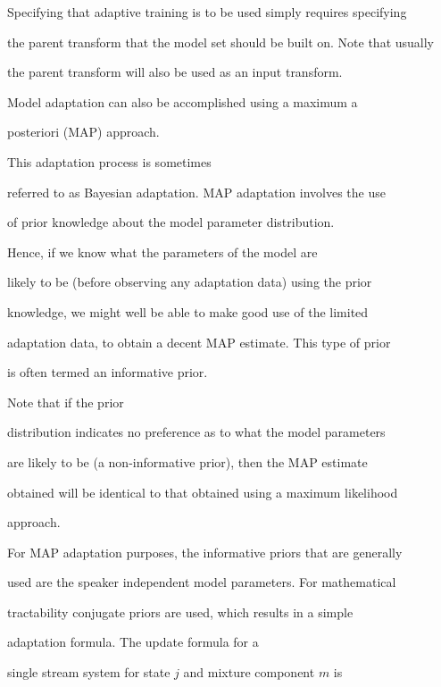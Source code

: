 Specifying that adaptive training is to be used simply requires specifying


the parent transform that the model set should be built on. Note that usually


the parent transform will also be used as an input transform.










Model adaptation can also be accomplished using a maximum a


posteriori (MAP) approach. 


This adaptation process is sometimes


referred to as Bayesian adaptation. MAP adaptation involves the use 


of prior knowledge about the model parameter distribution.


Hence, if we know what the parameters of the model are


likely to be (before observing any adaptation data) using the prior


knowledge, we might well be able to make good use of the limited


adaptation data, to obtain a decent MAP estimate. This type of prior


is often termed an informative prior.


Note that if the prior


distribution indicates no preference as to what the model parameters


are likely to be (a non-informative prior), then the MAP estimate


obtained will be identical to that obtained using a maximum likelihood


approach.





For MAP adaptation purposes, the informative priors that are generally


used are the speaker independent model parameters. For mathematical


tractability conjugate priors are used, which results in a simple


adaptation formula. The update formula for a 


single stream system for state $j$ and mixture component $m$ is





